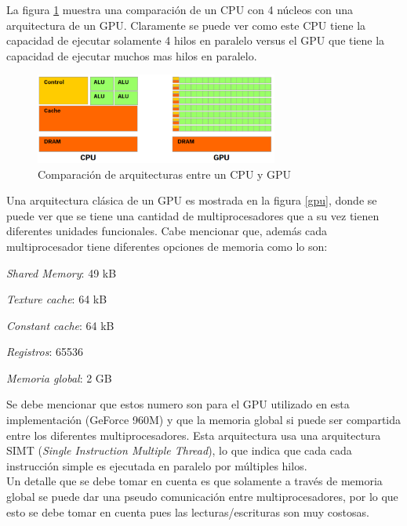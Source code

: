 \documentclass[conference]{IEEEtran}
\begin{document}
La figura \ref{cpu_vs_gpu} muestra una comparación de un CPU con 4 núcleos con una arquitectura de un GPU. Claramente se puede ver como este CPU tiene la capacidad de ejecutar solamente 4 hilos en paralelo versus el GPU que tiene la capacidad de ejecutar muchos mas hilos en paralelo.

\begin{figure}[H]
\centering
\includegraphics[width=8cm]{cpu_vs_gpu}
\caption{Comparación de arquitecturas entre un CPU y GPU \cite{cuda_by_example}}
\label{cpu_vs_gpu}
\end{figure}

Una arquitectura clásica de un GPU es mostrada en la figura \ref{gpu}, donde se puede ver que se tiene una cantidad de multiprocesadores que a su vez tienen diferentes unidades funcionales. Cabe mencionar que, además cada multiprocesador tiene diferentes opciones de memoria como lo son: 
\begin{list}{--}{}
\item
\textit{Shared Memory}: 49 kB
\item
\textit{Texture cache}: 64 kB
\item
\textit{Constant cache}: 64 kB
\item
\textit{Registros}: 65536
\item
\textit{Memoria global}: 2 GB
\end{list}

Se debe mencionar que estos numero son para el GPU utilizado en esta implementación (GeForce 960M) y que la memoria global si puede ser compartida entre los diferentes multiprocesadores. Esta arquitectura usa una arquitectura SIMT (\textit{Single Instruction Multiple Thread}), lo que indica que cada cada instrucción simple es ejecutada en paralelo por múltiples hilos.\\

Un detalle que se debe tomar en cuenta es que solamente a través de memoria global se puede dar una pseudo comunicación entre multiprocesadores, por lo que esto se debe tomar en cuenta pues las lecturas/escrituras son muy costosas.
\end{document}
